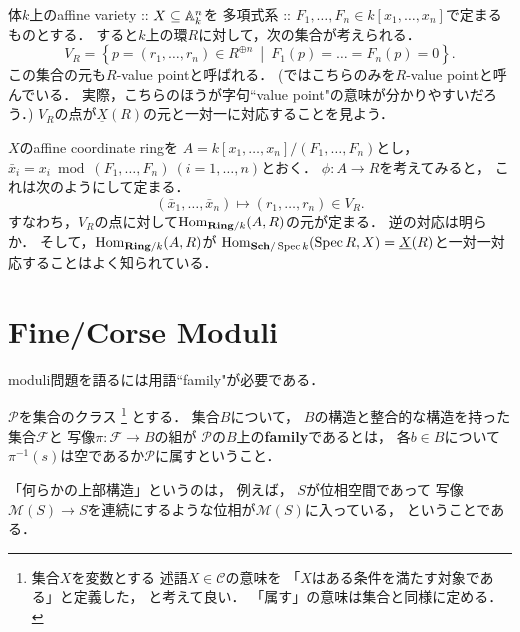 \documentclass[a4paper]{jsarticle}
\newcommand{\Sch}{\mathbf{Sch}}
\newcommand{\Ring}{\mathbf{Ring}}
\newcommand{\func}[1]{\underline{#1}}
\newcommand{\ftorM}{\mathcal{M}}
\begin{document}
    \begin{Example}
        体$k$上のaffine variety :: 
        $X \subseteq \mathbb{A}^n_k$を
        多項式系 :: $F_1,\dots,F_n \in k[x_1,\dots,x_n]$で定まるものとする．
        すると$k$上の環$R$に対して，次の集合が考えられる．
        \[ V_R=\left\{ p=(r_1,\dots,r_n) \in R^{\oplus n} ~\middle|~ F_1(p)=\dots=F_n(p)=0 \right\}. \]
        この集合の元も$R$-value pointと呼ばれる．
        (\cite{Muk1}ではこちらのみを$R$-value pointと呼んでいる．
        実際，こちらのほうが字句``value point"の意味が分かりやすいだろう．)
        $V_R$の点が$\func{X}(R)$の元と一対一に対応することを見よう．

        $X$のaffine coordinate ringを
        $A=k[x_1,\dots,x_n]/(F_1,\dots,F_n)$とし，
        $\bar{x}_i=x_i \bmod (F_1,\dots,F_n) ~(i=1,\dots,n)$とおく．
        $\phi: A \to R$を考えてみると，
        これは次のようにして定まる．
        \[ (\bar{x}_1,\dots,\bar{x}_n) \mapsto (r_1,\dots,r_n) \in V_R. \]
        すなわち，$V_R$の点に対して$\Hom_{\Ring/k}(A,R)$の元が定まる．
        逆の対応は明らか．
        そして，$\Hom_{\Ring/k}(A,R)$が
        $\Hom_{\Sch/\Spec k}(\Spec R, X)=\func{X}(R)$と一対一対応することはよく知られている．
    \end{Example}

\section{Fine/Corse Moduli}
    moduli問題を語るには用語``family"が必要である．

    \begin{Def}
        $\mathcal{P}$を集合のクラス
        \footnote
        {
            集合$X$を変数とする
            述語$X \in \mathcal{C}$の意味を
            「$X$はある条件を満たす対象である」と定義した，
            と考えて良い．
            「属す」の意味は集合と同様に定める．
        }
        とする．
        集合$B$について，
        $B$の構造と整合的な構造を持った集合$\mathcal{F}$と
        写像$\pi: \mathcal{F} \to B$の組が
        $\mathcal{P}$の$B$上の\textbf{family}であるとは，
        各$b \in B$について$\pi^{-1}(s)$は空であるか$\mathcal{P}$に属すということ．
    \end{Def}
    「何らかの上部構造」というのは，
    例えば，
    $S$が位相空間であって
    写像$\ftorM(S) \to S$を連続にするような位相が$\ftorM(S)$に入っている，
    ということである．
\end{document}
